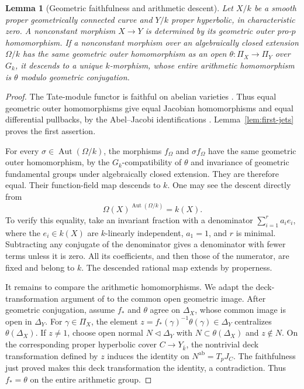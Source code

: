 \documentclass[11pt,a4paper]{article}
\numberwithin{equation}{section}
\theoremstyle{plain}
\newtheorem{lemma}[theorem]{Lemma}
\theoremstyle{definition}
\theoremstyle{remark}
\newcommand{\ab}{\mathrm{ab}}
\DeclareMathOperator{\Aut}{Aut}
\begin{document}
\begin{lemma}[Geometric faithfulness and arithmetic descent]
\label{lem:arithmetic-descent}
Let $X/k$ be a smooth proper geometrically connected curve and $Y/k$
proper hyperbolic, in characteristic zero. A nonconstant morphism
$X\to Y$ is determined by its geometric outer pro-$p$ homomorphism.
If a nonconstant morphism over an algebraically closed extension $\Omega/k$
has the same geometric outer homomorphism as an open
$\theta:\Pi_X\to\Pi_Y$ over $G_k$, it descends to a unique $k$-morphism,
whose entire arithmetic homomorphism is $\theta$ modulo geometric
conjugation.
\end{lemma}
\begin{proof}
The Tate-module functor is faithful on abelian varieties
\cite[Lemma~12.2]{MilneAV1986}. Thus equal geometric outer
homomorphisms give equal Jacobian homomorphisms and equal differential
pullbacks, by the Abel--Jacobi identifications
\cite[Propositions~2.2 and 9.1]{Milne1986}.
Lemma~\ref{lem:first-jets} proves the first assertion.

For every $\sigma\in\Aut(\Omega/k)$, the morphisms $f_\Omega$ and
$\sigma f_\Omega$ have the same geometric outer homomorphism, by the
$G_k$-compatibility of $\theta$ and invariance of geometric fundamental
groups under algebraically closed extension. They are therefore equal.
Their function-field map descends to $k$. One may see the descent
directly from
\[
                         \Omega(X)^{\Aut(\Omega/k)}=k(X).
\]
To verify this equality, take an invariant fraction with a denominator
$\sum_{i=1}^r a_ie_i$, where the $e_i\in k(X)$ are $k$-linearly
independent, $a_1=1$, and $r$ is minimal. Subtracting any conjugate of
the denominator gives a denominator with fewer terms unless it is zero.
All its coefficients, and then those of the numerator, are fixed and
belong to $k$. The descended rational map extends by properness.

It remains to compare the arithmetic homomorphisms. We adapt the
deck-transformation argument of \cite[Lemma~1 and Corollary~2]{Faltings1998}
to the common open geometric image. After geometric
conjugation, assume $f_*$ and $\theta$ agree on
$\Delta_X$, whose common image is open in $\Delta_Y$.
For $\gamma\in\Pi_X$, the element
$z=f_*(\gamma)^{-1}\theta(\gamma)\in\Delta_Y$ centralizes
$\theta(\Delta_X)$.
If $z\ne1$, choose open normal $N\triangleleft\Delta_Y$ with
$N\subset\theta(\Delta_X)$ and $z\notin N$. On the corresponding proper hyperbolic
cover $C\to Y_{\bar k}$, the nontrivial deck transformation defined by
$z$ induces the identity on $N^{\ab}=T_pJ_C$. The faithfulness just
proved makes this deck transformation the identity, a contradiction.
Thus $f_*=\theta$ on the entire arithmetic group.
\end{proof}
\end{document}
